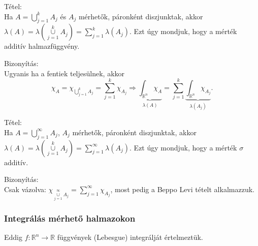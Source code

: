 \documentclass[12pt,a4paper]{scrartcl}
\newenvironment{tetel}{}{}
\newenvironment{bizonyitas}{}{}
\begin{document}
\begin{tetel}

Tétel:\\
Ha \(A = {\bigcup\limits_{j = 1}^{k}A_{j}}\) és \(A_{j}\) mérhetők,
páronként diszjunktak, akkor
\(\lambda\left( A \right) = \lambda\left( {\underset{j = 1}{\overset{k}{\cup}}A_{j}} \right) = {\sum\limits_{j = 1}^{k}{\lambda\left( A_{j} \right)}}\).
Ezt úgy mondjuk, hogy a mérték additív halmazfüggvény.

\end{tetel}

\begin{bizonyitas}

Bizonyítás:\\
Ugyanis ha a fentiek teljesülnek, akkor
\[{\chi _A} = {\chi _{\bigcup\limits_{j = 1}^k {{A_j}} }} = \sum\limits_{j = 1}^k {{\chi _{{A_j}}}}  \Rightarrow \underbrace {\int_{{\mathbb{R}^n}} {{\chi _A}} }_{\lambda \left( A \right)} = \sum\limits_{j = 1}^k {\underbrace {\int_{{\mathbb{R}^n}} {{\chi _{{A_j}}}} }_{\lambda \left( {{A_j}} \right)}}. \]

\end{bizonyitas}

\begin{tetel}

Tétel:\\
Ha \(A = {\bigcup\limits_{j = 1}^{\infty}A_{j}}\), \(A_{j}\) mérhetők,
páronként diszjunktak, akkor
\(\lambda\left( A \right) = \lambda\left( {\underset{j = 1}{\overset{k}{\cup}}A_{j}} \right) = {\sum\limits_{j = 1}^{\infty}{\lambda\left( A_{j} \right)}}\).
Ezt úgy mondjuk, hogy a mérték \(\sigma\) additív.

\end{tetel}

\begin{bizonyitas}

Bizonyítás:\\
Csak vázolva:
\(\chi_{\underset{j = 1}{\overset{\infty}{\cup}}A_{j}} = {\sum\limits_{j = 1}^{\infty}\chi_{A_{j}}}\),
most pedig a Beppo Levi tételt alkalmazzuk.

\end{bizonyitas}

\hypertarget{integralas-merheto-halmazokon}{%
\subsubsection{Integrálás mérhető
halmazokon}\label{integralas-merheto-halmazokon}}

Eddig \(\left. f:{\mathbb{R}}^{n}\rightarrow{\mathbb{R}} \right.\)
függvények (Lebesgue) integrálját értelmeztük.
\end{document}

